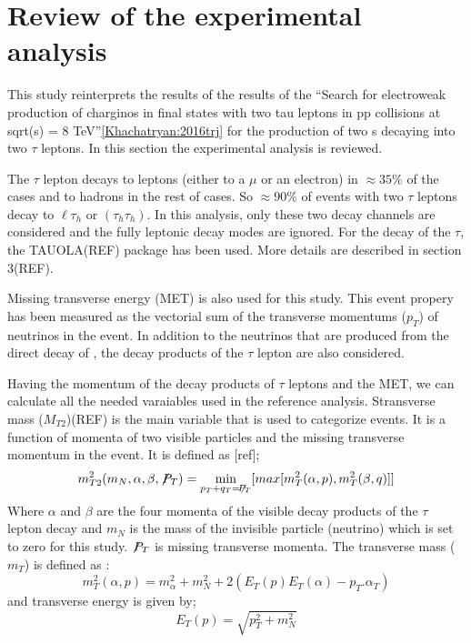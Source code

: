 \section{Review of the experimental analysis}


This study reinterprets the results of the results of the ``Search for electroweak production of charginos in final states with two tau leptons in pp collisions at sqrt(s) = 8 TeV''\ref{Khachatryan:2016trj} for the production of two \wprime s decaying into two $\tau$ leptons. In this section the experimental analysis is reviewed.

The $\tau$ lepton decays to leptons (either to a $\mu$ or an electron) in $\approx 35\%$ of the cases and to hadrons in the rest of cases. So $\approx 90\%$ of events with two $\tau$ leptons decay to $\ell\tau_h$ or $(\tau_h \tau_h)$. In this analysis, only these two decay channels are considered and the fully leptonic decay modes are ignored. For the decay of the $\tau$, the TAUOLA(REF) package has been used. More details are described in section 3(REF).

Missing transverse energy (MET) is also used for this study. This event propery has been measured as the vectorial sum of the transverse momentums ($p_{T}$) of neutrinos in the event. In addition to the neutrinos that are produced from the direct decay of \wprime, the decay products of the $\tau$ lepton are also considered.

Having the momentum of the decay products of $\tau$ leptons and the MET, we can calculate all the needed varaiables used in the reference analysis. Stransverse mass ($M_{T2}$)(REF) is the main variable that is used to categorize events. It is a function of momenta of two visible particles and the missing transverse momentum in the event. It is defined as [ref];
\begin{equation}
m^2_{T2}(m_{N},\alpha,\beta,\not\!P_{T}) = \displaystyle\min_{p_T+q_T=\not\!P_T} [max[m^2_{T}(\alpha,p),m^2_{T}(\beta,q)]]
\end{equation}
Where $\alpha$ and $\beta$ are the four momenta of the visible decay products of the $\tau$ lepton decay and  $m_N$ is the mass of the invisible particle (neutrino) which is set to zero for this study. $\not\!P_T$ is missing transverse momenta. The transverse mass ($m_{T}$) is defined as :
\begin{equation}
m^2_{T}(\alpha,p) =  m^2_{\alpha}+m^2_N+2(E_T(p)E_T(\alpha)-p_T.\alpha_T)
\end{equation}
and transverse energy is given by; 
\begin{equation}
E_T(p)=\sqrt{p^2_T+m^2_N}
\end{equation}

